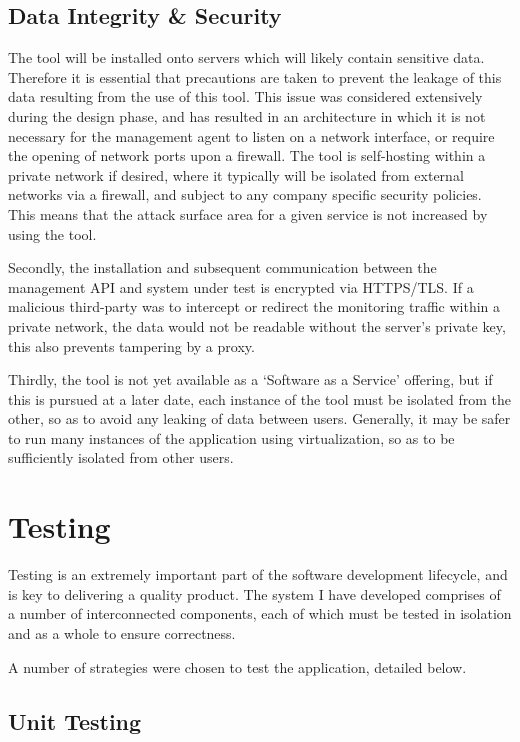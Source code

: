 \documentclass{cshonours}
\begin{document}
\section{Data Integrity \& Security}
    The tool will be installed onto servers which will likely contain sensitive data. Therefore it is essential that precautions are taken to prevent the leakage of this data resulting from the use of this tool. This issue was considered extensively during the design phase, and has resulted in an architecture in which it is not necessary for the management agent to listen on a network interface, or require the opening of network ports upon a firewall. The tool is self-hosting within a private network if desired, where it typically will be isolated from external networks via a firewall, and subject to any company specific security policies. This means that the attack surface area for a given service is not increased by using the tool.

    Secondly, the installation and subsequent communication between the management API and system under test is encrypted via HTTPS/TLS\@. If a malicious third-party was to intercept or redirect the monitoring traffic within a private network, the data would not be readable without the server's private key, this also prevents tampering by a proxy.

    Thirdly, the tool is not yet available as a `Software as a Service' offering, but if this is pursued at a later date, each instance of the tool must be isolated from the other, so as to avoid any leaking of data between users. Generally, it may be safer to run many instances of the application using virtualization, so as to be sufficiently isolated from other users.

\chapter{Testing}

Testing is an extremely important part of the software development lifecycle, and is key to delivering a quality product. The system I have developed comprises of a number of interconnected components, each of which must be tested in isolation and as a whole to ensure correctness.

A number of strategies were chosen to test the application, detailed below.

\section{Unit Testing}
\end{document}
